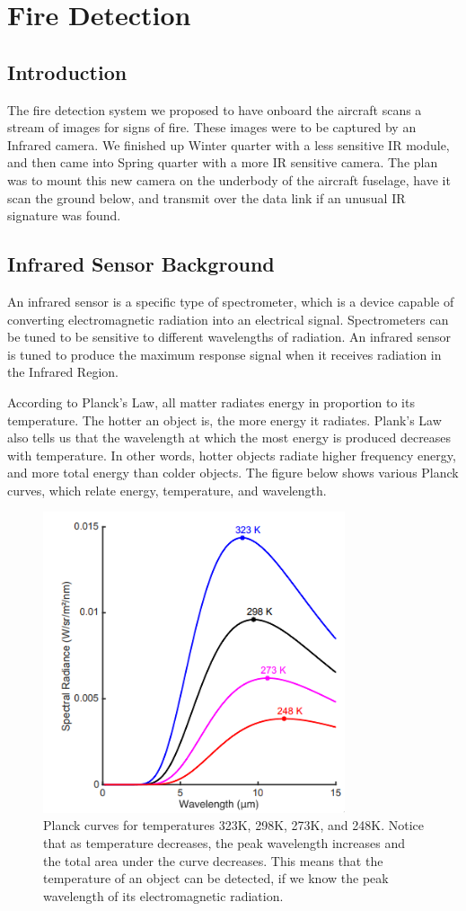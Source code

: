 \documentclass[12pt,journal,compsoc]{IEEEtran}
\begin{document}
\section{Fire Detection}
\subsection{Introduction}
The fire detection system we proposed to have onboard the aircraft scans a stream of images for signs of fire. These images were to be captured by an Infrared camera. We finished up Winter quarter with a less sensitive IR module, and then came into Spring quarter with a more IR sensitive camera. The plan was to mount this new camera on the underbody of the aircraft fuselage, have it scan the ground below, and transmit over the data link if an unusual IR signature was found.

\subsection{Infrared Sensor Background}
An infrared sensor is a specific type of spectrometer, which is a device capable of converting electromagnetic radiation into an electrical signal. Spectrometers can be tuned to be sensitive to different wavelengths of radiation. An infrared sensor is tuned to produce the maximum response signal when it receives radiation in the Infrared Region. 

According to Planck's Law, all matter radiates energy in proportion to its temperature. The hotter an object is, the more energy it radiates. Plank's Law also tells us that the wavelength at which the most energy is produced decreases with temperature. In other words, hotter objects radiate higher frequency energy, and more total energy than colder objects. The figure below shows various Planck curves, which relate energy, temperature, and wavelength.


\begin{figure}[h]
\centering
\includegraphics[width=3.5in]{plancka.png}
\caption{Planck curves for temperatures 323K, 298K, 273K, and 248K. Notice that as temperature decreases, the peak wavelength increases and the total area under the curve decreases. This means that the temperature of an object can be detected, if we know the peak wavelength of its electromagnetic radiation.}
\label{plancka_image}
\end{figure}
\end{document}

